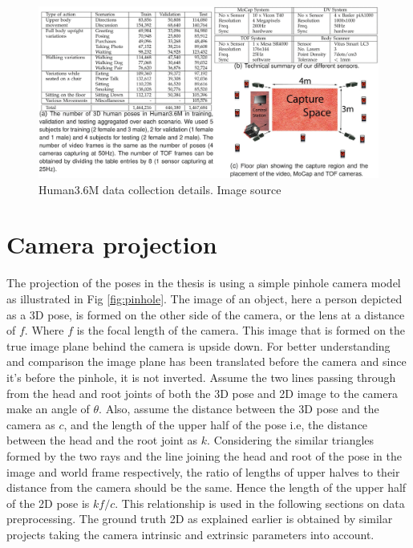 \begin{figure}[h]
    \centering
    \includegraphics[width=\textwidth]{figures/h36/data_collection.pdf}
    \caption{Human3.6M data collection details. Image source \cite{H3.6}}
    \label{fig:h36_data_collection}
\end{figure}

\section{Camera projection}
\label{sec:camera_projection}

The projection of the poses in the thesis is using a simple pinhole camera model as illustrated in Fig \ref{fig:pinhole}. The image of an object, here a person depicted as a 3D pose, is formed on the other side of the camera, or the lens at a distance of $f$. Where $f$ is the focal length of the camera. This image that is formed on the true image plane behind the camera is upside down. For better understanding and comparison the image plane has been translated before the camera and since it's before the pinhole, it is not inverted. Assume the two lines passing through from the head and root joints of both the 3D pose and 2D image to the camera make an angle of $\theta$. Also, assume the distance between the 3D pose and the camera as $c$, and the length of the upper half of the pose i.e, the distance between the head and the root joint as $k$. Considering the similar triangles formed by the two rays and the line joining the head and root of the pose in the image and world frame respectively, the ratio of lengths of upper halves to their distance from the camera should be the same. Hence the length of the upper half of the 2D pose is $k f/c$. This relationship is used in the following sections on data preprocessing. The ground truth 2D as explained earlier is obtained by similar projects taking the camera intrinsic and extrinsic parameters into account.

